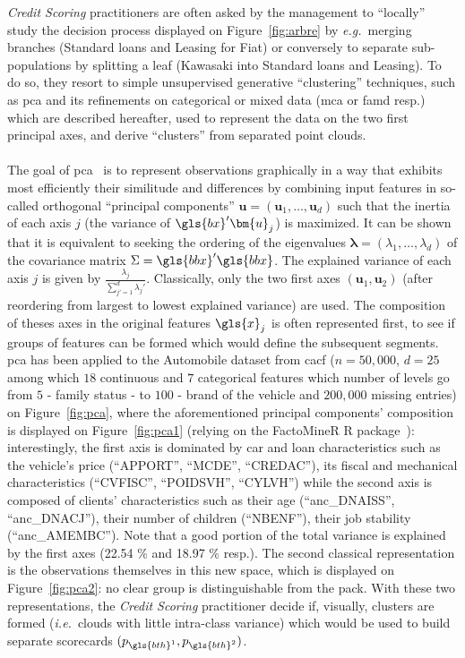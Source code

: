 \textit{Credit Scoring} practitioners are often asked by the management to ``locally'' study the decision process displayed on Figure~\ref{fig:arbre} by \textit{e.g.}\ merging branches (Standard loans and Leasing for Fiat) or conversely to separate sub-populations by splitting a leaf (Kawasaki into Standard loans and Leasing). To do so, they resort to simple unsupervised generative ``clustering'' techniques, such as \gls{pca} and its refinements on categorical or mixed data (\gls{mca} or \gls{famd} resp.) which are described hereafter, used to represent the data on the two first principal axes, and derive ``clusters'' from separated point clouds.

\paragraph{}

The goal of \gls{pca}~\cite{pages2014multiple} is to represent observations graphically in a way that exhibits most efficiently their similitude and differences by combining input features in so-called orthogonal ``principal components'' $\bm{u} = (\bm{u}_1,\dots,\bm{u}_d)$ such that the inertia of each axis $j$ (the variance of $\gls{bx}' \bm{u}_j$) is maximized. It can be shown that it is equivalent to seeking the ordering of the eigenvalues $\bm{\lambda} = (\lambda_1,\dots,\lambda_d)$ of the covariance matrix $\Sigma = \gls{bbx}'\gls{bbx}$. The explained variance of each axis $j$ is given by $\frac{\lambda_j}{\sum_{j'=1}^d \lambda_j'}$. Classically, only the two first axes $(\bm{u}_1,\bm{u}_2)$ (after reordering from largest to lowest explained variance) are used. The composition of theses axes in the original features $\gls{x}_j$ is often represented first, to see if groups of features can be formed which would define the subsequent segments. \gls{pca} has been applied to the Automobile dataset from \gls{cacf} ($n = 50{,}000$, $d = 25$ among which $18$ continuous and $7$ categorical features which number of levels go from $5$ - family status - to $100$ - brand of the vehicle and $200{,}000$ missing entries) on Figure~\ref{fig:pca}, where the aforementioned principal components' composition is displayed on Figure~\ref{fig:pca1} (relying on the FactoMineR \textsc{R} package~\cite{JSSv025i01}): interestingly, the first axis is dominated by car and loan characteristics such as the vehicle's price (``APPORT'', ``MCDE'', ``CREDAC''), its fiscal and mechanical characteristics (``CVFISC'', ``POIDSVH'', ``CYLVH'') while the second axis is composed of clients' characteristics such as their age (``anc\_DNAISS'', ``anc\_DNACJ''), their number of children (``NBENF''), their job stability (``anc\_AMEMBC''). Note that a good portion of the total variance is explained by the first axes (22.54 \% and 18.97 \% resp.). The second classical representation is the observations themselves in this new space, which is displayed on Figure~\ref{fig:pca2}: no clear group is distinguishable from the pack. With these two representations, the \textit{Credit Scoring} practitioner decide if, visually, clusters are formed (\textit{i.e.}\ clouds with little intra-class variance) which would be used to build separate scorecards $(p_{\gls{bth}^{1}},p_{\gls{bth}^{2}})$.

